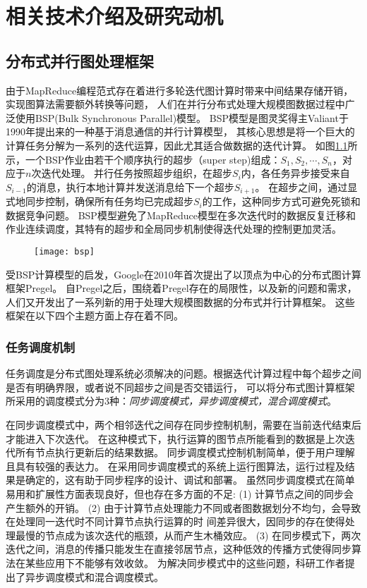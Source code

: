 \chapter{相关技术介绍及研究动机}
\section{分布式并行图处理框架}
由于MapReduce编程范式存在着进行多轮迭代图计算时带来中间结果存储开销，实现图算法需要额外转换等问题，
人们在并行分布式处理大规模图数据过程中广泛使用BSP(Bulk Synchronous Parallel)模型\cite{bsp@1990}。
BSP模型是图灵奖得主Valiant于1990年提出来的一种基于消息通信的并行计算模型，
其核心思想是将一个巨大的计算任务分解为一系列的迭代运算，因此尤其适合做数据的迭代计算。
如图\ref{fig:bsp}所示，一个BSP作业由若干个顺序执行的超步（super step)组成：$S_1,S_2,\cdots,S_n$，对应于$n$次迭代处理。
并行任务按照超步组织，在超步$S_i$内，各任务异步接受来自$S_{i-1}$的消息，执行本地计算并发送消息给下一个超步$S_{i+1}$。
在超步之间，通过显式地同步控制，确保所有任务均已完成超步$S_i$的工作，这种同步方式可避免死锁和数据竞争问题。
BSP模型避免了MapReduce模型在多次迭代时的数据反复迁移和作业连续调度，其特有的超步和全局同步机制使得迭代处理的控制更加灵活。

\begin{figure}[!htbp]
  \centering
  \texttt{[image: bsp]}
  \label{fig:bsp}
\end{figure}

受BSP计算模型的启发，Google在2010年首次提出了以顶点为中心的分布式图计算框架Pregel\cite{Malewicz@SIGMOD10}。
自Pregel之后，围绕着Pregel存在的局限性，以及新的问题和需求，人们又开发出了一系列新的用于处理大规模图数据的分布式并行计算框架。
这些框架在以下四个主题方面上存在着不同。

\subsection{任务调度机制}
任务调度是分布式图处理系统必须解决的问题。根据迭代计算过程中每个超步之间是否有明确界限，或者说不同超步之间是否交错运行，
可以将分布式图计算框架所采用的调度模式分为3种：\textit{同步调度模式，异步调度模式，混合调度模式}。

在同步调度模式中，两个相邻迭代之间存在同步控制机制，需要在当前迭代结束后才能进入下次迭代。
在这种模式下，执行运算的图节点所能看到的数据是上次迭代所有节点执行更新后的结果数据。
同步调度模式控制机制简单，便于用户理解且具有较强的表达力。
在采用同步调度模式的系统上运行图算法，运行过程及结果是确定的，这有助于同步程序的设计、调试和部署。    
虽然同步调度模式在简单易用和扩展性方面表现良好，但也存在多方面的不足:
(1) 计算节点之间的同步会产生额外的开销。
(2) 由于计算节点处理能力不同或者图数据划分不均匀，会导致在处理同一迭代时不同计算节点执行运算的时
间差异很大，因同步的存在使得处理最慢的节点成为该次迭代的瓶颈，从而产生木桶效应。
(3) 在同步模式下，两次迭代之间，消息的传播只能发生在直接邻居节点，这种低效的传播方式使得同步算法在某些应用下不能够有效收敛。
为解决同步模式中的这些问题，科研工作者提出了异步调度模式和混合调度模式。

